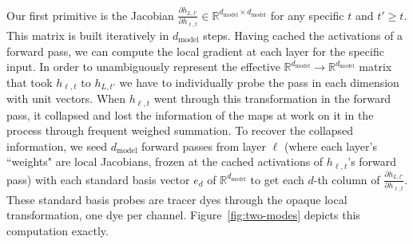\documentclass{article}
\newcommand{\dmodel}{d_{\text{model}}}
\begin{document}
Our first primitive is the Jacobian \(\frac{\partial h_{L,t'}}{\partial h_{\ell,t}} \in \mathbb{R}^{\dmodel \times \dmodel}\) for any specific \(t\) and \(t' \ge t\). This matrix is built iteratively in \(\dmodel\) steps. Having cached the activations of a forward pass, we can compute the local gradient at each layer for the specific input. In order to unambiguously represent the effective \(\mathbb{R}^{\dmodel} \to \mathbb{R}^{\dmodel}\) matrix that took \(h_{\ell,t}\) to \(h_{L,t'}\) we have to individually probe the pass in each dimension with unit vectors. When \(h_{\ell,t}\) went through this transformation in the forward pass, it collapsed and lost the information of the maps at work on it in the process through frequent weighed summation. To recover the collapsed information, we seed \(\dmodel\) forward passes from layer \(\ell\) (where each layer's ``weights" are local Jacobians, frozen at the cached activations of \(h_{\ell,t}\)'s forward pass) with each standard basis vector \(e_d\) of \(\mathbb{R}^{\dmodel}\) to get each \(d\)-th column of \(\frac{\partial h_{L,t'}}{\partial h_{\ell,t}}\). These standard basis probes are tracer dyes through the opaque local transformation, one dye per channel. Figure~\ref{fig:two-modes} depicts this computation exactly.   
\end{document}
